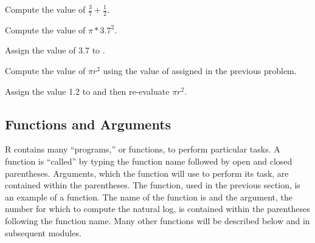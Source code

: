 \documentclass[10pt,openany]{book}\usepackage[]{graphicx}\usepackage[]{color}
\begin{document}

\vspace{-12pt}

\vspace{-8pt}
\begin{exsection}
  \item \label{revex:BasicsExpr1} \rhw{} Compute the value of $\frac{3}{7}+\frac{1}{2}$. 
  \item \label{revex:BasicsExpr2} \rhw{} Compute the value of $\pi*3.7^{2}$. 
  \item \label{revex:BasicsExpr3} \rhw{} Assign the value of 3.7 to . 
  \item \label{revex:BasicsExpr4} \rhw{} Compute the value of $\pi r^{2}$ using the value of  assigned in the previous problem. 
  \item \label{revex:BasicsExpr5} \rhw{} \hspace{18pt} Assign the value 1.2 to  and then re-evaluate $\pi r^{2}$. 
\end{exsection}

\vspace{-18pt}
\subsection{Functions and Arguments}  \label{sect:RFunctions}
\vspace{-12pt}
R contains many ``programs,'' or functions, to perform particular tasks.  A function is ``called'' by typing the function name followed by open and closed parentheses.  Arguments, which the function will use to perform its task, are contained within the parentheses.  The  function, used in the previous section, is an example of a function.  The name of the function is  and the argument, the number for which to compute the natural log, is contained within the parentheses following the function name.  Many other functions will be described below and in subsequent modules.


\vspace{-12pt}
\end{document}
